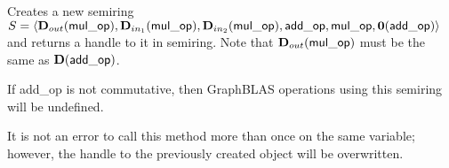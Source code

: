 Creates a new semiring $S = \langle \mbox{$\mathbf{D}_{out}$}({\sf mul\_op}), 
\mbox{$\mathbf{D}_{in_{1}}$}({\sf mul\_op}), \mbox{$\mathbf{D}_{in_{2}}$}({\sf mul\_op}), {\sf add\_op}, 
{\sf mul\_op}, \mathbf{0}({\sf add\_op})\rangle$ and returns a handle to it in 
{\sf semiring}.  Note that $\mbox{$\mathbf{D}_{out}$}({\sf mul\_op})$ must be the same as 
$\mathbf{D}({\sf add\_op})$.

If {\sf add\_op} is not commutative, then GraphBLAS operations using this semiring
will be undefined.

It is not an error to call this method more than once on the same variable;  
however, the handle to the previously created object will be overwritten. 
